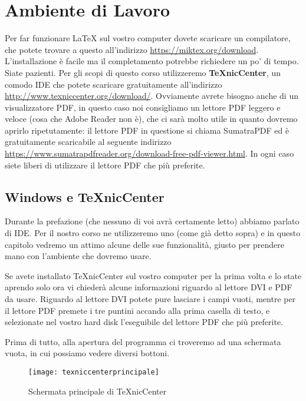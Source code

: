 \chapter{Ambiente di Lavoro}

Per far funzionare \LaTeX{} sul vostro computer dovete scaricare un
compilatore, che potete trovare a questo all'indirizzo
\url{https://miktex.org/download}. L'installazione è facile ma il completamento
potrebbe richiedere un po' di tempo. Siate pazienti.
Per gli scopi di questo corso utilizzeremo \textbf{TeXnicCenter}, un comodo IDE
che potete scaricare gratuitamente all'indirizzo
\url{http://www.texniccenter.org/download/}.
Ovviamente avrete bisogno anche di un visualizzatore PDF, in questo caso noi
consigliamo un lettore PDF leggero e veloce (cosa che Adobe Reader non è), che
ci sarà molto utile in quanto dovremo aprirlo ripetutamente: il lettore PDF in
questione si chiama SumatraPDF ed è gratuitamente scaricabile al seguente
indirizzo \url{https://www.sumatrapdfreader.org/download-free-pdf-viewer.html}.
In ogni caso siete liberi di utilizzare il lettore PDF che più preferite.

\section{Windows e TeXnicCenter}

Durante la prefazione (che nessuno di voi avrà certamente letto) abbiamo
parlato di IDE. Per il nostro corso ne utilizzeremo uno (come già detto sopra)
e in questo capitolo vedremo un attimo alcune delle sue funzionalità, giusto
per prendere mano con l'ambiente che dovremo usare.

Se avete installato TeXnicCenter sul vostro computer per la prima volta e lo
state aprendo solo ora vi chiederà alcune informazioni riguardo al lettore DVI
e PDF da usare. Riguardo al lettore DVI potete pure lasciare i campi vuoti,
mentre per il lettore PDF premete i tre puntini accando alla prima casella di
testo, e selezionate nel vostro hard disk l'eseguibile del lettore PDF che più
preferite.

Prima di tutto, alla apertura del programma ci troveremo ad una schermata
vuota, in cui possiamo vedere diversi bottoni.

\begin{figure}[H]
  \centering
  \texttt{[image: texniccenterprincipale]}
  \caption{Schermata principale di TeXnicCenter}
  \label{img:principale_texcenter}
\end{figure}

